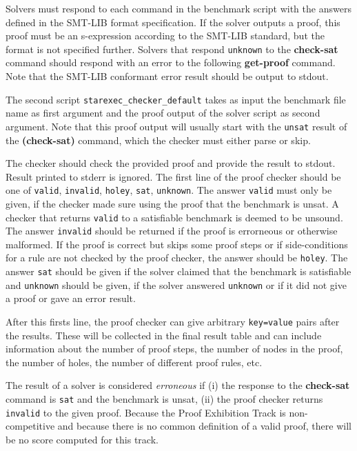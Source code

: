 \documentclass[12pt]{article}
\newcommand{\akey}[1]{\textbf{#1}\xspace}
\newcommand{\prooftrack}{Proof Exhibition Track\xspace}
\begin{document}
Solvers must respond to each command in the benchmark script with the
answers defined in the SMT-LIB format specification.  If the solver
outputs a proof, this proof must be an s-expression according to the
SMT-LIB standard, but the format is not specified further.  Solvers
that respond \texttt{unknown} to the \akey{check-sat} command should
respond with an error to the following \akey{get-proof} command.  Note
that the SMT-LIB conformant error result should be output to stdout.

The second script \texttt{starexec\_checker\_default} takes as input
the benchmark file name as first argument and the proof output of the
solver script as second argument.  Note that this proof output will
usually start with the \texttt{unsat} result of the \akey{(check-sat)}
command, which the checker must either parse or skip.

The checker should check the provided proof and provide the result to
stdout.  Result printed to stderr is ignored.  The first line of the
proof checker should be one of \texttt{valid}, \texttt{invalid},
\texttt{holey}, \texttt{sat}, \texttt{unknown}.  The answer \texttt{valid}
must only be given, if the checker made sure using the proof that the
benchmark is unsat.  A checker that returns \texttt{valid} to a
satisfiable benchmark is deemed to be unsound.  The answer
\texttt{invalid} should be returned if the proof is errorneous or
otherwise malformed.  If the proof is correct but skips some proof
steps or if side-conditions for a rule are not checked by the proof
checker, the answer should be \texttt{holey}.  The answer \texttt{sat}
should be given if the solver claimed that the benchmark is
satisfiable and \texttt{unknown} should be given, if the solver answered
\texttt{unknown} or if it did not give a proof or gave an error result.

After this firsts line, the proof checker can give arbitrary
\texttt{key=value} pairs after the results.  These will
be collected in the final result table and can include information
about the number of proof steps, the number of nodes in the proof, the
number of holes, the number of different proof rules, etc.

The result of a solver is considered \emph{erroneous} if (i) the
response to the \akey{check-sat} command is \texttt{sat} and the
benchmark is unsat, (ii) the proof checker returns \texttt{invalid} to
the given proof.  Because the \prooftrack is non-competitive and
because there is no common definition of a valid proof, there will be
no score computed for this track.
\end{document}
